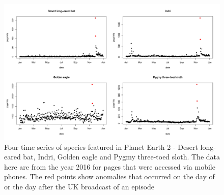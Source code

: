 \documentclass[12pt,letterpaper]{article}
\begin{document}
\begin{figure}[H]
\centering
    \includegraphics[keepaspectratio, totalheight=0.5 \textheight]{time series panel plot.pdf}
\caption{Four time series of species featured in Planet Earth 2 - Desert long-eared bat, Indri, Golden eagle and Pygmy three-toed sloth. The data here are from the year 2016 for pages that were accessed via mobile phones. The red points show anomalies that occurred on the day of or the day after the UK broadcast of an episode}
\label{timeseries}
\end{figure}
\end{document}
